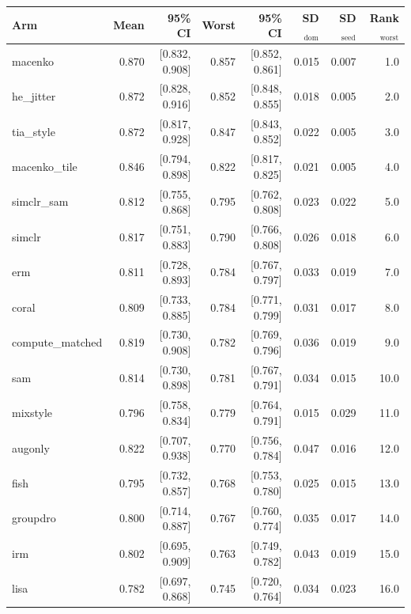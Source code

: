 \begin{tabular}{lrrrrrrr}
\toprule
Arm & Mean & 95\% CI & Worst & 95\% CI & SD$_\text{dom}$ & SD$_\text{seed}$ & Rank$_\text{worst}$ \\
\midrule
macenko & 0.870 & [0.832, 0.908] & 0.857 & [0.852, 0.861] & 0.015 & 0.007 & 1.0 \\
he\_jitter & 0.872 & [0.828, 0.916] & 0.852 & [0.848, 0.855] & 0.018 & 0.005 & 2.0 \\
tia\_style & 0.872 & [0.817, 0.928] & 0.847 & [0.843, 0.852] & 0.022 & 0.005 & 3.0 \\
macenko\_tile & 0.846 & [0.794, 0.898] & 0.822 & [0.817, 0.825] & 0.021 & 0.005 & 4.0 \\
simclr\_sam & 0.812 & [0.755, 0.868] & 0.795 & [0.762, 0.808] & 0.023 & 0.022 & 5.0 \\
simclr & 0.817 & [0.751, 0.883] & 0.790 & [0.766, 0.808] & 0.026 & 0.018 & 6.0 \\
erm & 0.811 & [0.728, 0.893] & 0.784 & [0.767, 0.797] & 0.033 & 0.019 & 7.0 \\
coral & 0.809 & [0.733, 0.885] & 0.784 & [0.771, 0.799] & 0.031 & 0.017 & 8.0 \\
compute\_matched & 0.819 & [0.730, 0.908] & 0.782 & [0.769, 0.796] & 0.036 & 0.019 & 9.0 \\
sam & 0.814 & [0.730, 0.898] & 0.781 & [0.767, 0.791] & 0.034 & 0.015 & 10.0 \\
mixstyle & 0.796 & [0.758, 0.834] & 0.779 & [0.764, 0.791] & 0.015 & 0.029 & 11.0 \\
augonly & 0.822 & [0.707, 0.938] & 0.770 & [0.756, 0.784] & 0.047 & 0.016 & 12.0 \\
fish & 0.795 & [0.732, 0.857] & 0.768 & [0.753, 0.780] & 0.025 & 0.015 & 13.0 \\
groupdro & 0.800 & [0.714, 0.887] & 0.767 & [0.760, 0.774] & 0.035 & 0.017 & 14.0 \\
irm & 0.802 & [0.695, 0.909] & 0.763 & [0.749, 0.782] & 0.043 & 0.019 & 15.0 \\
lisa & 0.782 & [0.697, 0.868] & 0.745 & [0.720, 0.764] & 0.034 & 0.023 & 16.0 \\
\bottomrule
\end{tabular}

